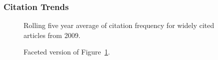 \documentclass[
  10pt,
  letterpaper,
  DIV=11,
  numbers=noendperiod,
  twoside]{scrartcl}
\begin{document}
\subsubsection*{Citation Trends}\label{sec-trends-2009}

\begin{figure}


\caption{\label{fig-citation-spaghetti-2009}Rolling five year average of
citation frequency for widely cited articles from 2009.}

\end{figure}%

\begin{figure}


\caption{\label{fig-citation-facet-2009}Faceted version of
Figure~\ref{fig-citation-spaghetti-2009}.}

\end{figure}%
\end{document}
